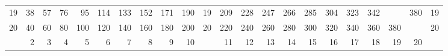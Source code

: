 \begin{center}
{\begin{tabular}{c|rrrrrrrrr|c|rrrrrrrrrr|c}
   19    &   38    &   57    &   76    &   95    &  114    &  133    &  152    &  171    &   190    &   19    &   209    &   228    &  247    &   266    &   285    &  304    &   323    &   342    &\q{361}   &   380    &   19   \\
   20    &   40    &   60    &   80    &  100    &  120    &  140    &  160    &  180    &   200    &   20    &   220    &   240    &  260    &   280    &   300    &  320    &   340    &   360    &   380    &\q{400}   &   20   \\
  \hline
         &    2    &    3    &    4    &    5    &    6    &    7    &    8    &    9    &    10    &         &    11    &    12    &   13    &    14    &    15    &   16    &    17    &    18    &    19    &    20    &        \\
  \end{tabular}}
\end{center}
